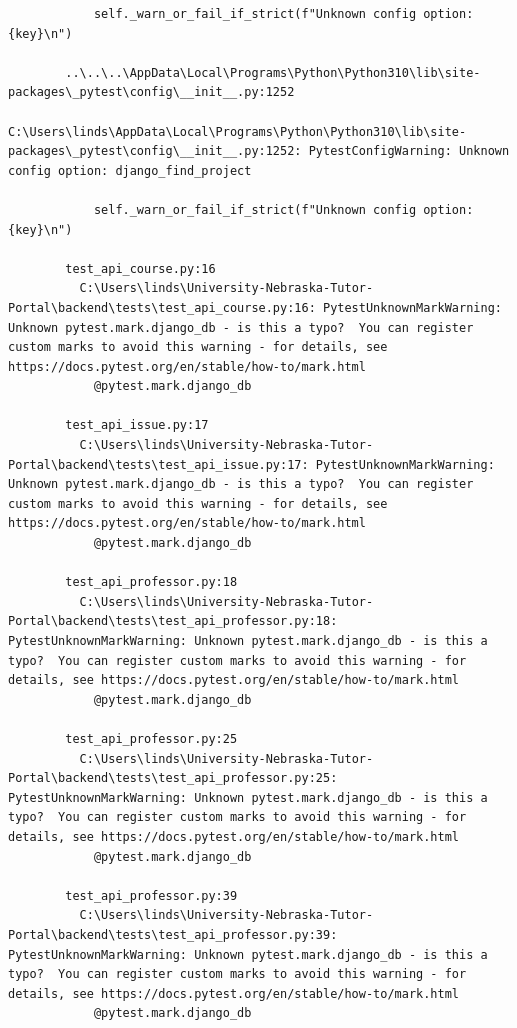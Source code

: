 \documentclass[oneside,openany,obeyspaces]{book}
\begin{document}
\begin{flushleft}
\begin{verbatim}
            self._warn_or_fail_if_strict(f"Unknown config option: {key}\n")
        
        ..\..\..\AppData\Local\Programs\Python\Python310\lib\site-packages\_pytest\config\__init__.py:1252
          C:\Users\linds\AppData\Local\Programs\Python\Python310\lib\site-packages\_pytest\config\__init__.py:1252: PytestConfigWarning: Unknown config option: django_find_project
        
            self._warn_or_fail_if_strict(f"Unknown config option: {key}\n")
        
        test_api_course.py:16
          C:\Users\linds\University-Nebraska-Tutor-Portal\backend\tests\test_api_course.py:16: PytestUnknownMarkWarning: Unknown pytest.mark.django_db - is this a typo?  You can register custom marks to avoid this warning - for details, see https://docs.pytest.org/en/stable/how-to/mark.html
            @pytest.mark.django_db
        
        test_api_issue.py:17
          C:\Users\linds\University-Nebraska-Tutor-Portal\backend\tests\test_api_issue.py:17: PytestUnknownMarkWarning: Unknown pytest.mark.django_db - is this a typo?  You can register custom marks to avoid this warning - for details, see https://docs.pytest.org/en/stable/how-to/mark.html
            @pytest.mark.django_db
        
        test_api_professor.py:18
          C:\Users\linds\University-Nebraska-Tutor-Portal\backend\tests\test_api_professor.py:18: PytestUnknownMarkWarning: Unknown pytest.mark.django_db - is this a typo?  You can register custom marks to avoid this warning - for details, see https://docs.pytest.org/en/stable/how-to/mark.html
            @pytest.mark.django_db
        
        test_api_professor.py:25
          C:\Users\linds\University-Nebraska-Tutor-Portal\backend\tests\test_api_professor.py:25: PytestUnknownMarkWarning: Unknown pytest.mark.django_db - is this a typo?  You can register custom marks to avoid this warning - for details, see https://docs.pytest.org/en/stable/how-to/mark.html
            @pytest.mark.django_db
        
        test_api_professor.py:39
          C:\Users\linds\University-Nebraska-Tutor-Portal\backend\tests\test_api_professor.py:39: PytestUnknownMarkWarning: Unknown pytest.mark.django_db - is this a typo?  You can register custom marks to avoid this warning - for details, see https://docs.pytest.org/en/stable/how-to/mark.html
            @pytest.mark.django_db
        

\end{verbatim}
\end{flushleft}
\end{document}
